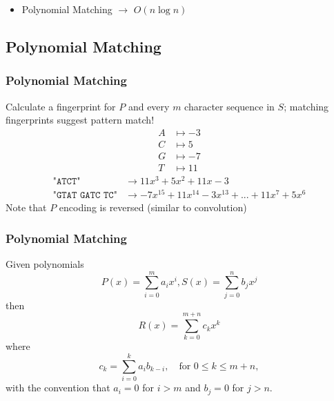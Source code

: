 \documentclass[
	11pt, %
]{beamer}
\begin{document}
\begin{frame}
\begin{center}

    \end{center}

    \begin{itemize}
        \item \alert{Polynomial Matching} $\longrightarrow$ $O(n\log n)$
    \end{itemize}
\end{frame}



\subsection{Polynomial Matching}
\begin{frame}
    \frametitle{Polynomial Matching}
    Calculate a fingerprint for $P$ and every $m$ character sequence in $S$; \alert {matching fingerprints} suggest pattern match!
    \bigskip
    \begin{align*}
        A & \mapsto -3 \\
        C & \mapsto 5  \\
        G & \mapsto -7 \\
        T & \mapsto 11
    \end{align*}
    \begin{align*}
        \texttt{"ATCT"}         & \longrightarrow 11x^3 + 5x^2 + 11x - 3                             \\
        \texttt{"GTAT GATC TC"} & \longrightarrow -7x^{15} + 11x^{14} - 3x^{13} + ... + 11x^7 + 5x^6
    \end{align*}
    Note that $P$ encoding is reversed (similar to convolution)
\end{frame}


\begin{frame}
    \frametitle{Polynomial Matching}
    Given polynomials
    \[
        P(x) = \sum_{i=0}^{m} a_i x^i, S(x) = \sum_{j=0}^{n} b_j x^j
    \]
    then
    \[
        R(x) = \sum_{k=0}^{m+n} c_k x^k
    \]
    where
    \[
        c_k = \sum_{i=0}^{k} a_i b_{k-i}, \quad \text{for } 0 \leq k \leq m+n,
    \]
    with the convention that \( a_i = 0 \) for \( i > m \) and \( b_j = 0 \) for \( j > n \).
\end{frame}
\end{document}
